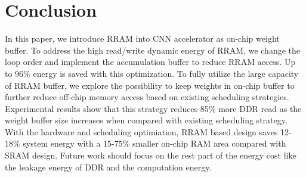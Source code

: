 \section{Conclusion}\label{sec:conclusion}

In this paper, we introduce RRAM into CNN accelerator as on-chip weight buffer. To address the high read/write dynamic energy of RRAM, we change the loop order and implement the accumulation buffer to reduce RRAM access. Up to 96\% energy is saved with this optimization. To fully utilize the large capacity of RRAM buffer, we explore the possibility to keep weights in on-chip buffer to further reduce off-chip memory access based on existing scheduling strategies. Experimental results show that this strategy reduces 85\% more DDR read as the weight buffer size increases when compared with existing scheduling strategy. With the hardware and scheduling optimiation, RRAM based design saves 12-18\% system energy with a 15-75\% smaller on-chip RAM area compared with SRAM design. Future work should focus on the rest part of the energy cost like the leakage energy of DDR and the computation energy.